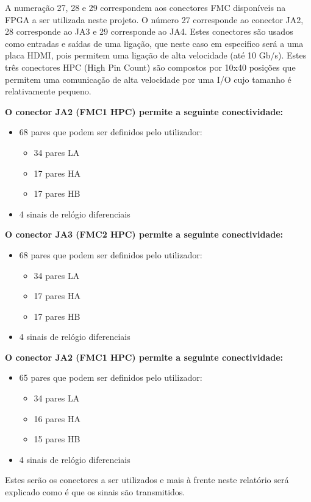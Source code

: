 A numeração 27, 28 e 29 correspondem aos conectores FMC disponíveis na FPGA a ser utilizada neste projeto. O número 27 corresponde ao conector JA2, 28 corresponde ao JA3 e 29 corresponde ao JA4. Estes conectores são usados como entradas e saídas de uma ligação, que neste caso em especifico será a uma placa HDMI, pois permitem uma ligação de alta velocidade (até 10 Gb/s). Estes três conectores HPC (High Pin Count) são compostos por 10x40 posições que permitem uma comunicação de alta velocidade por uma I/O cujo tamanho é relativamente pequeno. 

\textbf{O conector JA2 (FMC1 HPC) permite a seguinte conectividade:}
\begin{itemize}
	\item 68 pares que podem ser definidos pelo utilizador:
	\begin{itemize}
		\item 34 pares LA
		\item 17 pares HA
		\item 17 pares HB
	\end{itemize}
	\item 4 sinais de relógio diferenciais
\end{itemize}
\textbf{O conector JA3 (FMC2 HPC) permite a seguinte conectividade:}
\begin{itemize}
	\item 68 pares que podem ser definidos pelo utilizador:
	\begin{itemize}
		\item 34 pares LA
		\item 17 pares HA
		\item 17 pares HB
	\end{itemize}
	\item 4 sinais de relógio diferenciais
\end{itemize}
\textbf{O conector JA2 (FMC1 HPC) permite a seguinte conectividade:}
\begin{itemize}
	\item 65 pares que podem ser definidos pelo utilizador:
	\begin{itemize}
		\item 34 pares LA
		\item 16 pares HA
		\item 15 pares HB
	\end{itemize}
	\item 4 sinais de relógio diferenciais
\end{itemize}

Estes serão os conectores a ser utilizados e mais à frente neste relatório será explicado como é que os sinais são transmitidos. 

